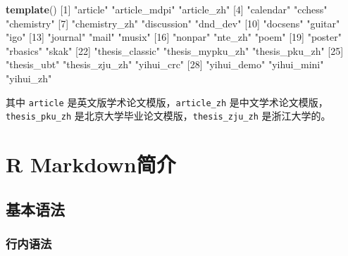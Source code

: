 \documentclass[]{article}
\newenvironment{Shaded}{\begin{snugshade}}{\end{snugshade}}
\newcommand{\DecValTok}[1]{\textcolor[rgb]{0.00,0.00,0.81}{#1}}
\newcommand{\KeywordTok}[1]{\textcolor[rgb]{0.13,0.29,0.53}{\textbf{#1}}}
\newcommand{\NormalTok}[1]{#1}
\newcommand{\StringTok}[1]{\textcolor[rgb]{0.31,0.60,0.02}{#1}}
\begin{document}
\begin{Shaded}
\begin{Highlighting}[]
\KeywordTok{template}\NormalTok{()}
\NormalTok{ [}\DecValTok{1}\NormalTok{] }\StringTok{"article"}         \StringTok{"article_mdpi"}    \StringTok{"article_zh"}     
\NormalTok{ [}\DecValTok{4}\NormalTok{] }\StringTok{"calendar"}        \StringTok{"cchess"}          \StringTok{"chemistry"}      
\NormalTok{ [}\DecValTok{7}\NormalTok{] }\StringTok{"chemistry_zh"}    \StringTok{"discussion"}      \StringTok{"dnd_dev"}        
\NormalTok{[}\DecValTok{10}\NormalTok{] }\StringTok{"docsens"}         \StringTok{"guitar"}          \StringTok{"igo"}            
\NormalTok{[}\DecValTok{13}\NormalTok{] }\StringTok{"journal"}         \StringTok{"mail"}            \StringTok{"musix"}          
\NormalTok{[}\DecValTok{16}\NormalTok{] }\StringTok{"nonpar"}          \StringTok{"nte_zh"}          \StringTok{"poem"}           
\NormalTok{[}\DecValTok{19}\NormalTok{] }\StringTok{"poster"}          \StringTok{"rbasics"}         \StringTok{"skak"}           
\NormalTok{[}\DecValTok{22}\NormalTok{] }\StringTok{"thesis_classic"}  \StringTok{"thesis_mypku_zh"} \StringTok{"thesis_pku_zh"}  
\NormalTok{[}\DecValTok{25}\NormalTok{] }\StringTok{"thesis_ubt"}      \StringTok{"thesis_zju_zh"}   \StringTok{"yihui_crc"}      
\NormalTok{[}\DecValTok{28}\NormalTok{] }\StringTok{"yihui_demo"}      \StringTok{"yihui_mini"}      \StringTok{"yihui_zh"}       
\end{Highlighting}
\end{Shaded}

其中 \texttt{article} 是英文版学术论文模版，\texttt{article\_zh}
是中文学术论文模版，\texttt{thesis\_pku\_zh}
是北京大学毕业论文模版，\texttt{thesis\_zju\_zh} 是浙江大学的。

\hypertarget{R-mark}{%
\section{R Markdown简介}\label{R-mark}}

\subsection{基本语法}

\subsubsection{行内语法}
\end{document}
